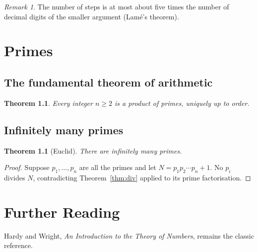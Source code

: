 \documentclass[11pt]{book}
\theoremstyle{definition}
\theoremstyle{plain}
\newtheorem{theorem}[definition]{Theorem}
\theoremstyle{remark}
\newtheorem*{remark}{Remark}
\begin{document}
\begin{remark}
The number of steps is at most about five times the number of decimal digits of the
smaller argument (Lamé's theorem).
\end{remark}

\chapter{Primes}
\section{The fundamental theorem of arithmetic}
\begin{theorem}
Every integer $n\ge2$ is a product of primes, uniquely up to order.
\end{theorem}

\section{Infinitely many primes}
\begin{theorem}[Euclid]
There are infinitely many primes.
\end{theorem}
\begin{proof}
Suppose $p_1,\dots,p_n$ are all the primes and let $N = p_1p_2\cdots p_n + 1$. No $p_i$
divides $N$, contradicting Theorem~\ref{thm:div} applied to its prime factorisation.
\end{proof}

\backmatter
\chapter{Further Reading}
Hardy and Wright, \emph{An Introduction to the Theory of Numbers}, remains the classic
reference.
\end{document}
